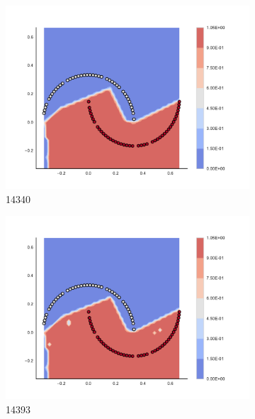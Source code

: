 \begin{figure}[h]
\begin{subfigure}[b]{0.09\textwidth}
    \includegraphics[clip, trim=2.35cm 1.75cm 4.5cm 0cm,width=\textwidth]{img/convergence/14340.pdf}
    \caption{14340}
    \label{fig:convergence_14340}
\end{subfigure}
%
\begin{subfigure}[b]{0.09\textwidth}
    \includegraphics[clip, trim=2.35cm 1.75cm 4.5cm 0cm,width=\textwidth]{img/convergence/14393.pdf}
    \caption{14393}
    \label{fig:convergence_14393}
\end{subfigure}
%
\begin{subfigure}[b]{0.09\textwidth}

\end{subfigure}
\end{figure}
